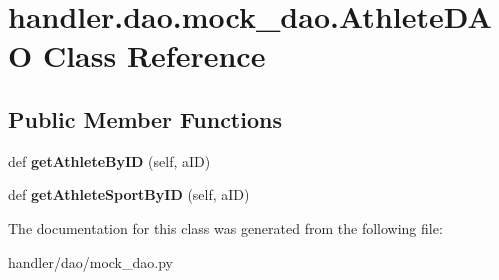 \hypertarget{classhandler_1_1dao_1_1mock__dao_1_1_athlete_d_a_o}{}\section{handler.\+dao.\+mock\+\_\+dao.\+Athlete\+D\+AO Class Reference}
\label{classhandler_1_1dao_1_1mock__dao_1_1_athlete_d_a_o}
\subsection*{Public Member Functions}
\begin{DoxyCompactItemize}
\item 
\mbox{\label{classhandler_1_1dao_1_1mock__dao_1_1_athlete_d_a_o_a27f69c5ed70c9e560851f70323bac1cb}} 
def {\bfseries get\+Athlete\+By\+ID} (self, a\+ID)
\item 
\mbox{\label{classhandler_1_1dao_1_1mock__dao_1_1_athlete_d_a_o_afb0b5e54535cf92b9678c2554b321682}} 
def {\bfseries get\+Athlete\+Sport\+By\+ID} (self, a\+ID)
\end{DoxyCompactItemize}


The documentation for this class was generated from the following file\+:\begin{DoxyCompactItemize}
\item 
handler/dao/mock\+\_\+dao.\+py\end{DoxyCompactItemize}
